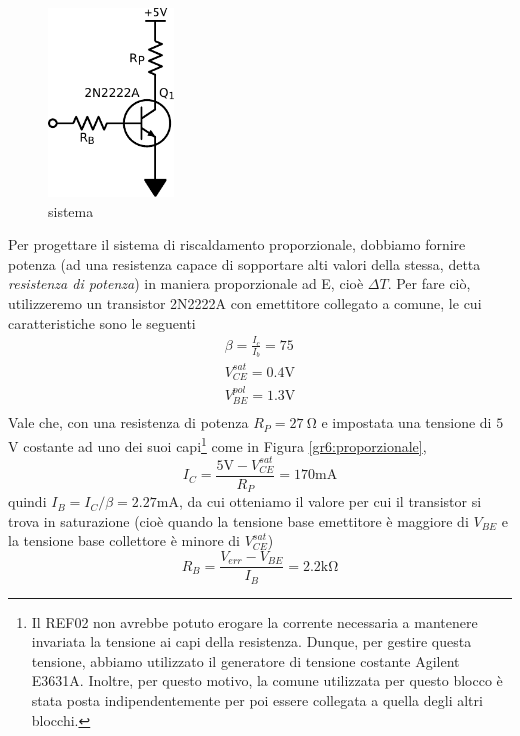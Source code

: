 \begin{figure}
\centering
\includegraphics[height=5cm]{../E06/latex/P5.pdf}
\caption{sistema}
\label{fig6:sistema}
\end{figure}

Per progettare il sistema di riscaldamento proporzionale, dobbiamo fornire potenza (ad una resistenza capace di sopportare alti valori della stessa, detta \textit{resistenza di potenza}) in maniera proporzionale ad E, cioè $\Delta T$.
Per fare ciò, utilizzeremo un transistor 2N2222A con emettitore collegato a comune, le cui caratteristiche sono le seguenti
$$\begin{array}{rl}
\beta = \frac{I_c}{I_b} = 75\\
V_{CE}^{sat}=0.4 \si{\volt}\\
V_{BE}^{pol}=1.3 \si{\volt}\\
\end{array}
$$
Vale che, con una resistenza di potenza $R_{P} = \SI{27}{\ohm}$ e impostata una tensione di $5$ \si{\volt} costante ad uno dei suoi capi\footnote{Il REF02 non avrebbe potuto erogare la corrente necessaria a mantenere invariata la tensione ai capi della resistenza.
Dunque, per gestire questa tensione, abbiamo utilizzato il generatore di tensione costante Agilent E3631A.
Inoltre, per questo motivo, la comune utilizzata per questo blocco è stata posta indipendentemente per poi essere collegata a quella degli altri blocchi.} come in Figura \ref{gr6:proporzionale},
$$I_{C}=\frac{5 \si{\volt}- V_{CE}^{sat}}{R_P}=170 \si{\milli\ampere}$$
quindi $I_B=I_{C}/\beta=2.27$\si{\milli\ampere}, da cui otteniamo il valore per cui il transistor si trova in saturazione (cioè quando la tensione base emettitore è maggiore di $V_{BE}$ e la tensione base collettore è minore di $V_{CE}^{sat}$)
$$R_B=\frac{V_{err} - V_{BE}}{I_B}=2.2 \si{\kilo\ohm}$$

